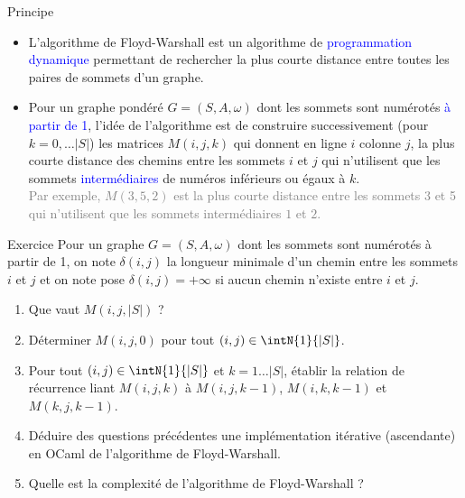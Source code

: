 \documentclass[10pt]{beamer}
\begin{document}
\begin{frame}[fragile]{\Ctitle}{\stitle}
	\begin{block}{Principe}
		\begin{itemize}
			\item<1-> L'algorithme de Floyd-Warshall est un algorithme de \textcolor{blue}{programmation dynamique} permettant de rechercher la plus courte distance entre toutes les paires de sommets d'un graphe.
			\item<2-> Pour un graphe pondéré $G = (S,A, \omega)$ dont les sommets sont numérotés \textcolor{blue}{à partir de 1}, l'idée de l'algorithme est de construire successivement (pour $k=0, \dots |S|$) les matrices $M(i,j,k)$ qui donnent en ligne $i$ colonne $j$, la plus courte distance des chemins entre les sommets $i$ et $j$ qui n'utilisent que les sommets  \textcolor{blue}{intermédiaires} de numéros inférieurs ou égaux à $k$. \\
			\textcolor{gray}{Par exemple, $M(3,5,2)$ est la plus courte distance entre les sommets 3 et 5 qui n'utilisent que les sommets intermédiaires $1$ et $2$.}
		\end{itemize}
	\end{block}
\end{frame}

\begin{frame}[fragile]{\Ctitle}{\stitle}
	\begin{exampleblock}{Exercice}
		Pour un graphe $G=(S,A, \omega)$ dont les sommets sont numérotés à partir de 1, on note $\delta(i,j)$ la longueur minimale d'un chemin entre les sommets $i$ et $j$ et on note pose $\delta(i,j) = +\infty$ si aucun chemin n'existe entre $i$ et $j$.
		\begin{enumerate}
			\item<1-> Que vaut $M(i,j,|S|)$ ?
			\item<2-> Déterminer $M(i,j,0)$ pour tout $(i,j) \in \intN{1}{|S|}$.
			\item<3-> Pour tout $(i,j) \in \intN{1}{|S|}$ et $k = 1 \dots |S|$, établir la relation de récurrence liant $M(i,j,k)$ à $M(i,j,k-1)$, $M(i,k,k-1)$ et $M(k,j, k-1)$.
			\item<4-> Déduire des questions précédentes une implémentation itérative (ascendante) en OCaml de l'algorithme de Floyd-Warshall.
			\item<5-> Quelle est la complexité de l'algorithme de Floyd-Warshall ?
		\end{enumerate}
	\end{exampleblock}
\end{frame}
\end{document}

